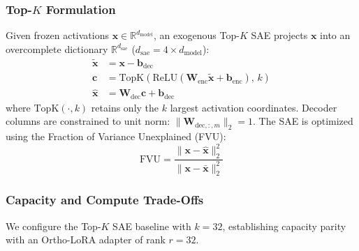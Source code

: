 \documentclass[10pt,twocolumn,letterpaper]{article}
\begin{document}
\subsubsection{Top-$K$ Formulation}
Given frozen activations $\bm{x} \in \mathbb{R}^{d_{\text{model}}}$, an exogenous Top-$K$ SAE projects $\bm{x}$ into an overcomplete dictionary $\mathbb{R}^{d_{\text{sae}}}$ ($d_{\text{sae}} = 4 \times d_{\text{model}}$):
\begin{align}
    \tilde{\bm{x}} &= \bm{x} - \bm{b}_{\text{dec}} \\
    \bm{c} &= \text{TopK}\left( \text{ReLU}(\bm{W}_{\text{enc}} \tilde{\bm{x}} + \bm{b}_{\text{enc}}), \, k \right) \\
    \hat{\bm{x}} &= \bm{W}_{\text{dec}} \bm{c} + \bm{b}_{\text{dec}}
\end{align}
where $\text{TopK}(\cdot, k)$ retains only the $k$ largest activation coordinates. Decoder columns are constrained to unit norm: $\|\bm{W}_{\text{dec}, :, m}\|_2 = 1$. The SAE is optimized using the Fraction of Variance Unexplained (FVU):
\begin{equation}
    \text{FVU} = \frac{\|\bm{x} - \hat{\bm{x}}\|_2^2}{\|\bm{x} - \bar{\bm{x}}\|_2^2}
\end{equation}

\subsubsection{Capacity and Compute Trade-Offs}
We configure the Top-$K$ SAE baseline with $k=32$, establishing capacity parity with an Ortho-LoRA adapter of rank $r=32$.

\begin{table}[htbp]
    \centering
    \small
    \caption{\textbf{Architectural Footprint: Ortho-LoRA vs. Top-$K$ SAE.} Evaluated on \texttt{Qwen-2.5-0.5B} ($d_{\text{model}} = 896$) at Layer 12.}
    \label{tab:capacity_comparison}
\end{table}
\end{document}
